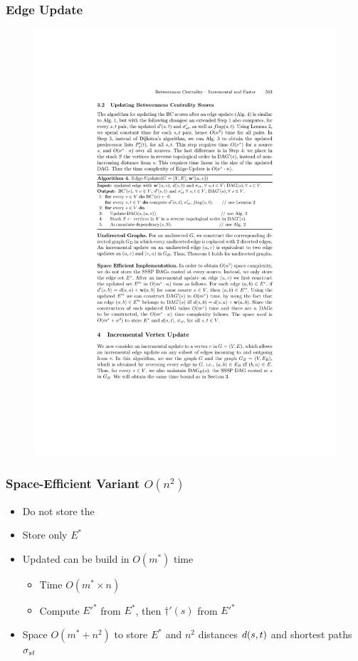 \begin{frame}
  \frametitle{Edge Update}

  \begin{figure}[H]
    \centering
    \includegraphics[width=\textwidth]{imgs/npr14-algo4}
  \end{figure}
  
\end{frame}

\begin{frame}
  \frametitle{Space-Efficient Variant $O(n^2)$}
  
  \begin{itemize}
    \item Do not store the \sssp \dag
    \item Store only $E^*$
    \item Updated \dag can be build in $O(m^*)$ time
    \begin{itemize}
      \item Time $O(m^* \times n)$
      \item Compute ${E'}^*$ from $E^*$, then $\dag'(s)$ from ${E'}^*$
    \end{itemize}
    \item Space $O(m^* + n^2)$ to store $E^*$ and $n^2$ distances $d(s,t)$ and shortest paths $\sigma_{st}$
  \end{itemize}
  
\end{frame}

